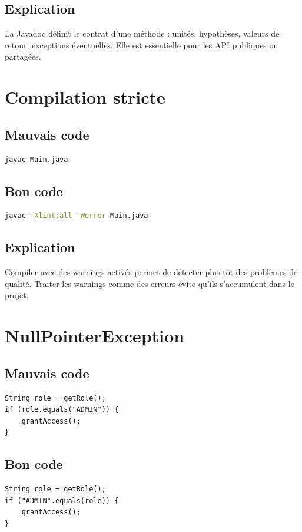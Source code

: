 \documentclass[a4paper,11pt]{report}
\begin{document}
\section{Explication}
La Javadoc définit le contrat d'une méthode : unités, hypothèses, valeurs de retour, exceptions éventuelles.
Elle est essentielle pour les API publiques ou partagées.

\chapter{Compilation stricte}

\section{Mauvais code}
\begin{lstlisting}
javac Main.java
\end{lstlisting}

\section{Bon code}
\begin{lstlisting}[language=bash]
javac -Xlint:all -Werror Main.java
\end{lstlisting}

\section{Explication}
Compiler avec des warnings activés permet de détecter plus tôt des problèmes de qualité.
Traiter les warnings comme des erreurs évite qu'ils s'accumulent dans le projet.

\chapter{NullPointerException}

\section{Mauvais code}
\begin{lstlisting}
String role = getRole();
if (role.equals("ADMIN")) {
    grantAccess();
}
\end{lstlisting}

\section{Bon code}
\begin{lstlisting}
String role = getRole();
if ("ADMIN".equals(role)) {
    grantAccess();
}
\end{lstlisting}
\end{document}
